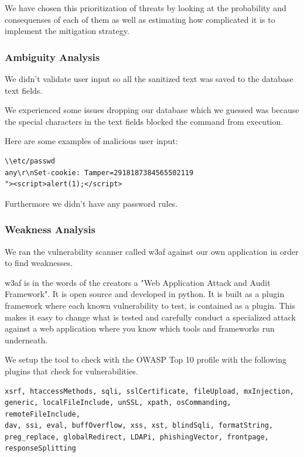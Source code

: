 \documentclass[a4paper]{article}
\begin{document}
We have chosen this prioritization of threats by looking at the probability and consequenses of each of them as well as estimating how complicated it is to implement the mitigation strategy.



\subsubsection{Ambiguity Analysis}

We didn't validate user input so all the sanitized text was saved to the database text fields. 

We experienced some issues dropping our database which we guessed was because the special characters in the text fields blocked the command from execution.

Here are some examples of malicious user input:
\begin{verbatim}
\\etc/passwd
any\r\nSet-cookie: Tamper=2918187384565502119
"><script>alert(1);</script>
\end{verbatim}

Furthermore we didn't have any password rules.

\subsubsection{Weakness Analysis}
We ran the vulnerability scanner called w3af against our own application in order to find weaknesses.

w3af is in the words of the creators a "Web Application Attack and Audit Framework". It is open source and developed in python. It is built as a plugin framework where each known vulnerability to test, is contained as a plugin. This makes it easy to change what is tested and carefully conduct a specialized attack against a web application where you know which tools and frameworks run underneath.

We setup the tool to check with the OWASP Top 10 profile with the following plugins that check for vulnerabilities.

\begin{verbatim}
xsrf, htaccessMethods, sqli, sslCertificate, fileUpload, mxInjection, 
generic, localFileInclude, unSSL, xpath, osCommanding, remoteFileInclude, 
dav, ssi, eval, buffOverflow, xss, xst, blindSqli, formatString, 
preg_replace, globalRedirect, LDAPi, phishingVector, frontpage, 
responseSplitting
\end{verbatim}
     
\end{document}
